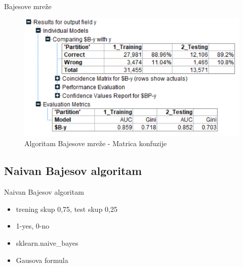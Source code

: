 \documentclass{beamer}
\begin{document}
\begin{frame}{Bajesove mreže}
    \begin{figure}[h!]
                \begin{center}
                \includegraphics[scale=0.60]{Bajes_matrix.png}
                \end{center}
                \caption{Algoritam Bajesove mreže - Matrica konfuzije}
     \end{figure}
\end{frame}

\subsection{Naivan Bajesov algoritam}

\begin{frame}{Naivan Bajesov algoritam}
    \begin{itemize}
    	\item trening skup 0,75, test skup 0,25
        \item 1-yes, 0-no
        \item sklearn.naive\_bayes
        \item Gausova formula 
    \end{itemize}
\end{frame}
\end{document}
